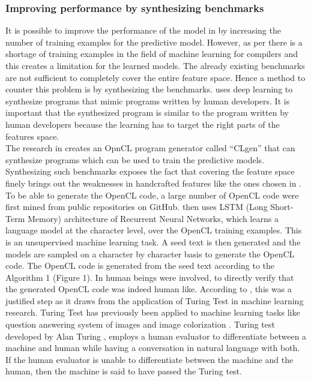\documentclass[a4paper,11pt]{article}
\begin{document}
 \subsubsection{Improving performance by synthesizing benchmarks}
 \indent\indent It is possible to improve the performance of the model in \cite{second} by increasing the number of training examples for the predictive model. However, as per \cite{sixth} there is a shortage of training examples in the field of machine learning for compilers and this creates a limitation for the learned models. The already existing benchmarks are not sufficient to completely cover the entire feature space. Hence a method to counter this problem is by synthesizing the benchmarks. \cite{sixth} uses deep learning to synthesize programs that mimic programs written by human developers. It is important that the synthesized program is similar to the program written by human developers because the learning has to target the right parts of the features space.\\
 \indent The research in \cite{sixth} creates an OpnCL program generator called ``CLgen'' that can synthesize programs which can be used to train the predictive models. Synthesizing such benchmarks exposes the fact that covering the feature space finely brings out the  weaknesses in handcrafted features like the ones chosen in \cite{second}.
 \indent To be able to generate the OpenCL code, a large number of OpenCL code were first mined from public repositories on GitHub. \cite{sixth} then uses LSTM (Long Short-Term Memory) architecture of Recurrent Neural Networks, which learns a language model at the character level, over the OpenCL training examples. This is an unsupervised machine learning task. A seed text is then generated and the models are sampled on a character by character basis to generate the OpenCL code. The OpenCL code is generated from the seed text according to the Algorithm 1 (Figure 1). In \cite{sixth} human beings were involved, to directly verify that the generated OpenCL code  was indeed human like. According to \cite{sixth}, this was a justified step as it draws from the application of Turing Test in machine learning research. Turing Test has previously been applied to machine learning tasks like question answering system of images \cite{qa} and image colorization \cite{colorization}. Turing test developed by Alan Turing \cite{turing}, employs a human evaluator to differentiate between a machine and human while having a conversation in natural language with both. If the human evaluator is unable to differentiate between the machine and the human, then the machine is said to have passed the Turing test.
\end{document}
